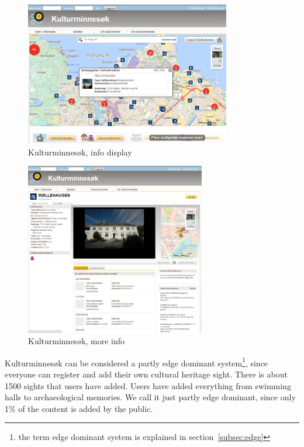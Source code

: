 \documentclass[11pt]{book}
\begin{document}
\begin{figure}[H]
      \centering
      \includegraphics[width=0.8\textwidth]{Figures/Prestudy/kulturminnesokClick.png}
      \caption{Kulturminnesøk, info display}
      \label{fig:pre_kulturInfo}
\end{figure}

\begin{figure}[H]
      \centering
      \includegraphics[width=0.7\textwidth]{Figures/Prestudy/kulturminnesokMoreInfo.png}
      \caption{Kulturminnesøk, more info}
      \label{fig:pre_kulturMoreInfo}
\end{figure}

Kulturminnesøk can be considered a partly edge dominant system\footnote{the term edge dominant system is explained in section~\ref{subsec:edge}}, since everyone can register and add their own cultural heritage sight. There is about 1500 sights that users have added. Users have added everything from swimming halls to archaeological memories. We call it just partly edge dominant, since only 1\% of the content is added by the public.
\end{document}
